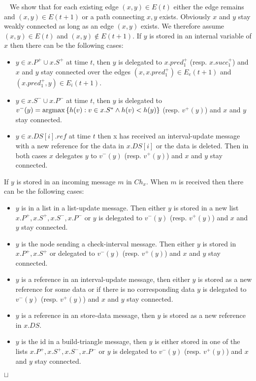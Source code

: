 \documentclass[11pt]{article}
\newcommand{\sq}{\hbox{\rlap{$\sqcap$}$\sqcup$}}
\newcommand{\qed}{\hspace*{\fill}\sq}
\newenvironment{proof}{\noindent {\bf Proof.}\ }{\qed\par\vskip 4mm\par}
\def\argmax{{\rm argmax}}
\begin{document}
\begin{proof}
We show that for each existing edge $(x,y)\in E(t)$ either the edge remains and $(x,y)\in E(t+1)$ or a path connecting $x,y$ exists. Obviously $x$ and $y$ stay weakly connected as long as an edge $(x,y)$ exists. We therefore assume $(x,y) \in E(t)$ and $(x,y)\notin E(t+1)$. If $y$ is stored in an internal variable of $x$ then there can be the following cases:

\begin{itemize}
  \item $y \in x.P^+ \cup x.S^+$ at time $t$, then $y$ is delegated to $x.pred^+_1$ (resp. $x.succ^+_1$) and $x$ and $y$ stay connected over the edges $(x,x.pred^+_1) \in E_e(t+1)$ and $(x.pred^+_1,y)\in E_i(t+1)$.
  \item $y \in x.S^- \cup x.P^-$ at time $t$, then $y$ is delegated to $v^{-}(y)=\argmax \left\{h(v) : v \in x.S^* \wedge h(v)< h(y) \right\}$ (resp. $v^{+}(y)$) and $x$ and $y$ stay connected.
  \item $y \in x.DS[i].ref$ at time $t$ then x has received an interval-update message with a new reference for the data in $x.DS[i]$ or the data is deleted. Then in both cases $x$ delegates $y$ to $v^{-}(y)$ (resp. $v^{+}(y)$) and $x$ and $y$ stay connected.
\end{itemize}

If $y$ is stored in an incoming message $m$ in $Ch_x$. When $m$ is received then there can be the following cases:

\begin{itemize}
  \item $y$ is in a list in a list-update message. Then either $y$ is stored in a new list $x.P^+,x.S^+,x.S^-,x.P^-$ or $y$ is delegated to $v^{-}(y)$ (resp. $v^{+}(y)$) and $x$ and $y$ stay connected.
  \item $y$ is the node sending a check-interval message. Then either $y$ is stored in $x.P^+, x.S^+$ or delegated to $v^{-}(y)$ (resp. $v^{+}(y)$) and $x$ and $y$ stay connected.
  \item $y$ is a reference in an interval-update message, then either $y$ is stored as a new reference for some data or if there is no corresponding data $y$ is delegated to $v^{-}(y)$ (resp. $v^{+}(y)$) and $x$ and $y$ stay connected.
  \item $y$ is a reference in an store-data message, then $y$ is stored as a new reference in $x.DS$.
  \item $y$ is the id in a build-triangle message, then $y$ is either stored in one of the lists $x.P^+,x.S^+,x.S^-,x.P^-$ or $y$ is delegated to $v^{-}(y)$ (resp. $v^{+}(y)$) and $x$ and $y$ stay connected.
\end{itemize}
\end{proof}
\end{document}
